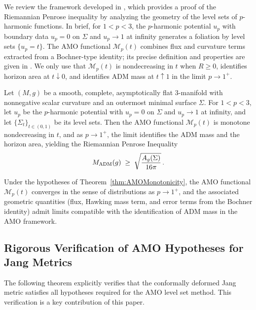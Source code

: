 We review the framework developed in \cite{amo2024}, which provides a proof of the Riemannian Penrose inequality by analyzing the geometry of the level sets of $p$-harmonic functions. In brief, for $1<p<3$, the $p$-harmonic potential $u_p$ with boundary data $u_p=0$ on $\Sigma$ and $u_p\to 1$ at infinity generates a foliation by level sets $\{u_p=t\}$. The AMO functional $\mathcal{M}_p(t)$ combines flux and curvature terms extracted from a Bochner-type identity; its precise definition and properties are given in \cite{amo2024}. We only use that $\mathcal{M}_p(t)$ is nondecreasing in $t$ when $R\ge 0$, identifies horizon area at $t\downarrow 0$, and identifies ADM mass at $t\uparrow 1$ in the limit $p\to 1^+$.

\begin{theorem}\label{thm:AMOMonotonicity}\label{thm:p-harmonic-penrose}
Let $(M,g)$ be a smooth, complete, asymptotically flat 3-manifold with nonnegative scalar curvature and an outermost minimal surface $\Sigma$. For $1<p<3$, let $u_p$ be the $p$-harmonic potential with $u_p=0$ on $\Sigma$ and $u_p\to 1$ at infinity, and let $\{\Sigma_t\}_{t\in(0,1)}$ be its level sets. Then the AMO functional $\mathcal{M}_p(t)$ is monotone nondecreasing in $t$, and as $p\to 1^+$, the limit identifies the ADM mass and the horizon area, yielding the Riemannian Penrose Inequality
\[
 M_{\mathrm{ADM}}(g) \;\ge\; \sqrt{\frac{A_g(\Sigma)}{16\pi}}\, .
\]
\end{theorem}

\begin{proposition}\label{prop:AMO_limits}
Under the hypotheses of Theorem~\ref{thm:AMOMonotonicity}, the AMO functional $\mathcal{M}_p(t)$ converges in the sense of distributions as $p\to 1^+$, and the associated geometric quantities (flux, Hawking mass term, and error terms from the Bochner identity) admit limits compatible with the identification of ADM mass in the AMO framework.
\end{proposition}

\subsection{Rigorous Verification of AMO Hypotheses for Jang Metrics}\label{sec:AMOVerification}

The following theorem explicitly verifies that the conformally deformed Jang metric satisfies all hypotheses required for the AMO level set method. This verification is a key contribution of this paper.

